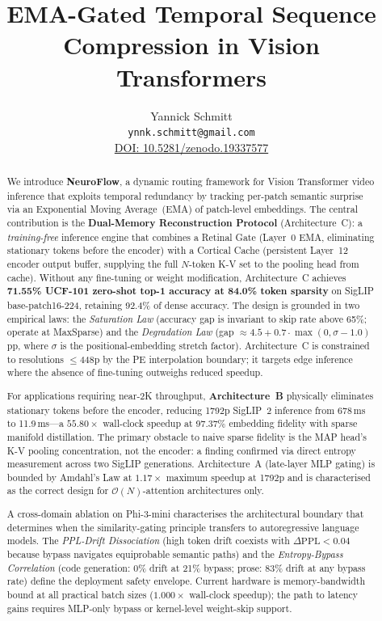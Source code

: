 \documentclass{article}
\title{EMA-Gated Temporal Sequence Compression in Vision Transformers}
\author{Yannick Schmitt \\ 
\texttt{ynnk.schmitt@gmail.com} \\
\vspace{4pt} 
\href{https://doi.org/10.5281/zenodo.19337577}{DOI: 10.5281/zenodo.19337577}}
\begin{document}
\maketitle

\begin{abstract}
We introduce \textbf{NeuroFlow}, a dynamic routing framework for Vision
Transformer video inference that exploits temporal redundancy by tracking
per-patch semantic surprise via an Exponential Moving Average~(EMA) of
patch-level embeddings. The central contribution is the
\textbf{Dual-Memory Reconstruction Protocol} (Architecture~C): a
\emph{training-free} inference engine that combines a Retinal Gate
(Layer~0 EMA, eliminating stationary tokens before the encoder) with a
Cortical Cache (persistent Layer~12 encoder output buffer, supplying the
full $N$-token K-V set to the pooling head from cache). Without any
fine-tuning or weight modification, Architecture~C achieves
\textbf{71.55\% UCF-101 zero-shot top-1 accuracy at 84.0\% token
sparsity} on SigLIP base-patch16-224, retaining 92.4\% of dense
accuracy. The design is grounded in two empirical laws: the
\emph{Saturation Law} (accuracy gap is invariant to skip rate above 65\%;
operate at MaxSparse) and the \emph{Degradation Law} (gap $\approx
4.5 + 0.7\cdot\max(0, \sigma-1.0)$\,pp, where $\sigma$ is the
positional-embedding stretch factor). Architecture~C is constrained to
resolutions $\leq$448p by the PE interpolation boundary; it targets
edge inference where the absence of fine-tuning outweighs reduced
speedup.

For applications requiring near-2K throughput, \textbf{Architecture~B}
physically eliminates stationary tokens before the encoder, reducing
1792p SigLIP~2 inference from 678\,ms to 11.9\,ms---a
$\mathbf{55.80\times}$ wall-clock speedup at 97.37\% embedding fidelity
with sparse manifold distillation. The primary obstacle to naive sparse
fidelity is the MAP head's K-V pooling concentration, not the encoder: a
finding confirmed via direct entropy measurement across two SigLIP
generations. Architecture~A (late-layer MLP gating) is bounded by
Amdahl's Law at $1.17\times$ maximum speedup at 1792p and is
characterised as the correct design for $\mathcal{O}(N)$-attention
architectures only.

A cross-domain ablation on Phi-3-mini characterises the architectural
boundary that determines when the similarity-gating principle transfers
to autoregressive language models. The \emph{PPL-Drift Dissociation}
(high token drift coexists with $\Delta\mathrm{PPL} < 0.04$ because bypass
navigates equiprobable semantic paths) and the \emph{Entropy-Bypass
Correlation} (code generation: 0\% drift at 21\% bypass; prose: 83\%
drift at any bypass rate) define the deployment safety envelope. Current
hardware is memory-bandwidth bound at all practical batch sizes
($1.000\times$ wall-clock speedup); the path to latency gains requires
MLP-only bypass or kernel-level weight-skip support.
\end{abstract}
\end{document}
